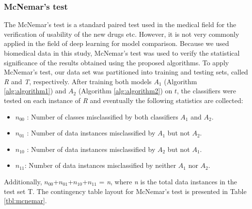 \documentclass{ieeeaccess}
\begin{document}
\subsubsection{McNemar's test}
The McNemar's test is a standard paired test used in the medical field for the verification of usability of the new drugs etc. However, it is not very commonly applied in the field of deep learning for model comparison. Because we used biomedical data in this study, McNemar's test was used to verify the statistical significance of the results obtained using the proposed algorithms.
To apply McNemar's test, our data set was partitioned into training and testing sets, called \emph{R} and \emph{T}, respectively. After training both models $A_1$ (Algorithm \ref{alg:algorithm1}) and $A_2$ (Algorithm \ref{alg:algorithm2}) on $t$, the classifiers were tested on each instance of \emph{R} and eventually the following statistics are collected:
\begin{itemize}
    \item $n_{00}$ : Number of classes misclassified by both classifiers $A_1$ and $A_2$.
    \item $n_{01}$ : Number of data instances misclassified by $A_1$ but not $A_2$.
    \item $n_{10}$ : Number of data instances misclassified by $A_2$ but not $A_1$. 
    \item $n_{11}$: Number of data instances misclassified by neither $A_1$ nor $A_2$.
\end{itemize}
Additionally, $n_{00}$+$n_{01}$+$n_{10}$+$n_{11}$ = \emph{n}, where \emph{n} is the total data instances in the test set T. The contingency table layout for McNemar's test is presented in Table \ref{tbl:mcnemar}. 
\end{document}
